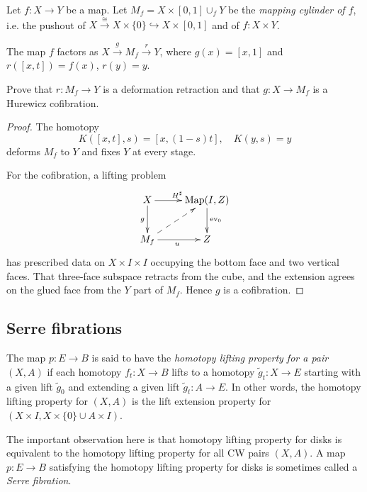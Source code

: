 \begin{definition}
\label{definition-from-homework}
	Let $f:X\to Y$ be a map. Let
	$M_f=X\times[0,1]\cup_fY$ be the {\it
	mapping cylinder of $f$}, i.e. the pushout
	of
	$X\overset{\cong}{\to}X\times\{0\}
	\hookrightarrow
	X\times[0,1]$ and of $f:X\times Y$.
\end{definition}

The map $f$ factors as
$X\xrightarrow{g}M_f\xrightarrow{r}Y$,
where $g(x)=[x,1]$ and
$r([x,t])=f(x)$, $r(y)=y$.

\begin{exercise}
Prove that $r:M_f\to Y$ is a
deformation retraction and that
$g:X\to M_f$ is a Hurewicz cofibration.
\end{exercise}

\begin{proof}
The homotopy
$$
K([x,t],s)=[x,(1-s)t],
\quad K(y,s)=y
$$
deforms $M_f$ to $Y$ and fixes $Y$ at
every stage.

For the cofibration, a lifting problem
$$
\xymatrix{
X\ar[r]^{H^\sharp}\ar[d]_{g}
&\operatorname{Map}(I,Z)
 \ar[d]^{\operatorname{ev}_0}\\
M_f\ar[r]_{u}
 \ar@{-->}[ur]
&Z
}
$$
has prescribed data on $X\times I\times I$
occupying the bottom face and two vertical
faces. That three-face subspace retracts
from the cube, and the extension agrees on
the glued face from the $Y$ part of $M_f$.
Hence $g$ is a cofibration.
\end{proof}

\subsection{Serre fibrations}
\label{subsection-serre-fibrations}

\begin{definition}[Hatcher, p. 376]
\label{definition-hatcher-p-376}
		The map $p:E\to B$ is said to have the {\it
		homotopy lifting property for a pair}
		$(X,A)$ if each homotopy $f_t:X\to B$ lifts
		to a homotopy $\tilde{g}_t:X\to E$ starting
		with a given lift $\tilde{g}_0$ and
		extending a given lift $\tilde{g}_t:A\to
		E$. In other words, the homotopy lifting
		property for $(X,A)$ is the lift extension
		property for $(X\times I,X\times\{0\}\cup
		A\times I)$.

	The important observation here is that
	homotopy lifting property for disks is
	equivalent to the homotopy lifting property
	for all CW pairs $(X,A)$. A map $p:E\to B$
	satisfying the homotopy lifting property for
	disks is sometimes called a {\it Serre
	fibration}.
\end{definition}

